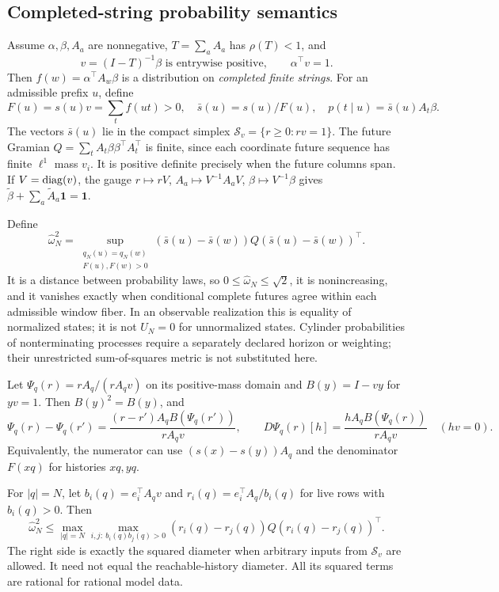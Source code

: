 \subsection{Completed-string probability semantics}
Assume $\alpha,\beta,A_a$ are nonnegative, $T=\sum_aA_a$ has $\rho(T)<1$, and
\[
 v=(I-T)^{-1}\beta\text{ is entrywise positive},\qquad \alpha^\top v=1.
\]
Then $f(w)=\alpha^\top A_w\beta$ is a distribution on \emph{completed finite strings}. For an admissible prefix $u$, define
\[
 F(u)=s(u)v=\sum_t f(ut)>0,\quad
 \bar s(u)=s(u)/F(u),\quad p(t\mid u)=\bar s(u)A_t\beta.
\]
The vectors $\bar s(u)$ lie in the compact simplex $\mathcal S_v=\{r\ge0:rv=1\}$. The future Gramian $Q=\sum_tA_t\beta\beta^\top A_t^\top$ is finite, since each coordinate future sequence has finite $\ell^1$ mass $v_i$. It is positive definite precisely when the future columns span. If $V=\operatorname{diag}(v)$, the gauge $r\mapsto rV$, $A_a\mapsto V^{-1}A_aV$, $\beta\mapsto V^{-1}\beta$ gives $\widetilde\beta+\sum_a\widetilde A_a\mathbf1=\mathbf1$.

Define
\[
 \widehat\omega_N^2=
 \sup_{\substack{q_N(u)=q_N(w)\\F(u),F(w)>0}}
       (\bar s(u)-\bar s(w))Q(\bar s(u)-\bar s(w))^\top.
\]
It is a distance between probability laws, so $0\le\widehat\omega_N\le\sqrt2$, it is nonincreasing, and it vanishes exactly when conditional complete futures agree within each admissible window fiber. In an observable realization this is equality of normalized states; it is not $U_N=0$ for unnormalized states. Cylinder probabilities of nonterminating processes require a separately declared horizon or weighting; their unrestricted sum-of-squares metric is not substituted here.

\begin{theorem}\label{III:S:thm:projective}
Let $\Psi_q(r)=rA_q/(rA_qv)$ on its positive-mass domain and $B(y)=I-vy$ for $yv=1$. Then $B(y)^2=B(y)$, and
\[
 \Psi_q(r)-\Psi_q(r')
 =\frac{(r-r')A_qB(\Psi_q(r'))}{rA_qv},\qquad
 D\Psi_q(r)[h]=\frac{hA_qB(\Psi_q(r))}{rA_qv}\quad(hv=0).
\]
Equivalently, the numerator can use $(s(x)-s(y))A_q$ and the denominator $F(xq)$ for histories $xq,yq$.
\end{theorem}


\begin{theorem}\label{III:S:thm:rowsimplex}
For $|q|=N$, let $b_i(q)=e_i^\top A_qv$ and $r_i(q)=e_i^\top A_q/b_i(q)$ for live rows with $b_i(q)>0$. Then
\[
 \widehat\omega_N^2\le
 \max_{|q|=N}\max_{i,j:\ b_i(q)b_j(q)>0}
           (r_i(q)-r_j(q))Q(r_i(q)-r_j(q))^\top.
\]
The right side is exactly the squared diameter when arbitrary inputs from $\mathcal S_v$ are allowed. It need not equal the reachable-history diameter. All its squared terms are rational for rational model data.
\end{theorem}


